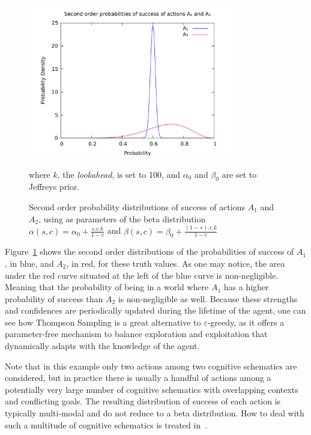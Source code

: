 \documentclass[runningheads]{llncs}
\begin{document}
\begin{figure}
  \centerline{\includegraphics[width=0.8\textwidth]{pictures/actiondist.pdf}}
  \caption{Second order probability distributions of success of
    actions $A_1$ and $A_2$, using as parameters of the beta
    distribution $\alpha(s, c)=\alpha_0 + \frac{s.c.k}{1-c}$ and
    $\beta(s, c)=\beta_0 + \frac{(1-s).c.k}{1-c}$} where $k$, the
  \emph{lookahead}, is set to 100, and $\alpha_0$ and $\beta_0$ are
  set to Jeffreys prior.
  \label{fig:actiondist}
\end{figure}
Figure~\ref{fig:actiondist} shows the second order distributions of
the probabilities of success of $A_1$, in blue, and $A_2$, in red, for
these truth values.  As one may notice, the area under the red curve
situated at the left of the blue curve is non-negligible.  Meaning
that the probability of being in a world where $A_1$ has a higher
probability of success than $A_2$ is non-negligible as well.  Because
these strengths and confidences are periodically updated during the
lifetime of the agent, one can see how Thompson Sampling is a great
alternative to $\varepsilon$-greedy, as it offers a parameter-free
mechanism to balance exploration and exploitation that dynamically
adapts with the knowledge of the agent.

Note that in this example only two actions among two cognitive
schematics are considered, but in practice there is usually a handful
of actions among a potentially very large number of cognitive
schematics with overlapping contexts and conflicting goals.  The
resulting distribution of success of each action is typically
multi-modal and do not reduce to a beta distribution.  How to deal
with such a multitude of cognitive schematics is treated
in~\cite{Geisweiller2018}.
\end{document}
